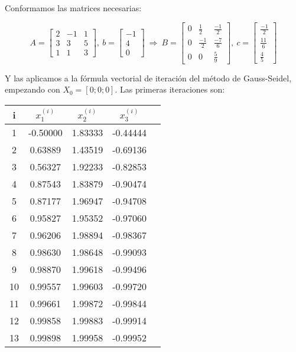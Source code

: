 \documentclass{article}
\begin{document}
Conformamos las matrices necesarias:

\begin{equation*}
    A = \begin{bmatrix}
        2 & -1 & 1 \\
        3 &  3 & 5 \\
        1 &  1 & 3
    \end{bmatrix},\ 
    b = \begin{bmatrix}
        -1 \\
         4 \\
         0
    \end{bmatrix}\ \Longrightarrow\ 
    B = \begin{bmatrix}
        0 &  \frac{1}{2} & \frac{-1}{2} \\
        0 & \frac{-1}{2} & \frac{-7}{6} \\
        0 &            0 &  \frac{5}{9}
    \end{bmatrix},\ 
    c = \begin{bmatrix}
        \frac{-1}{2} \\
        \frac{11}{6} \\
         \frac{4}{5}
    \end{bmatrix}
\end{equation*}

Y las aplicamos a la fórmula vectorial de iteración del método de Gauss-Seidel,
empezando con $X_0=[0;0;0]$. Las primeras iteraciones son:

\begin{table}[h]
\centering
\begin{tabular}{ccccc}
    i & $x_1^{(i)}$ & $x_2^{(i)}$ & $x_3^{(i)}$ \\\hline
    1 & -0.50000    & 1.83333     & -0.44444    \\
    2 & 0.63889     & 1.43519     & -0.69136    \\
    3 & 0.56327     & 1.92233     & -0.82853    \\
    4 & 0.87543     & 1.83879     & -0.90474    \\
    5 & 0.87177     & 1.96947     & -0.94708    \\
    6 & 0.95827     & 1.95352     & -0.97060    \\
    7 & 0.96206     & 1.98894     & -0.98367    \\
    8 & 0.98630     & 1.98648     & -0.99093    \\
    9 & 0.98870     & 1.99618     & -0.99496    \\
   10 & 0.99557     & 1.99603     & -0.99720    \\
   11 & 0.99661     & 1.99872     & -0.99844    \\
   12 & 0.99858     & 1.99883     & -0.99914    \\
   13 & 0.99898     & 1.99958     & -0.99952
\end{tabular}
\end{table}
\end{document}
